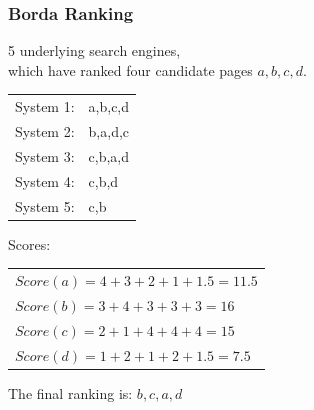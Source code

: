 \documentclass{beamer}
\begin{document}
\begin{frame}
    \frametitle{Borda Ranking}


    \begin{block}{5 underlying search engines, \\ 
          which have ranked  four candidate pages $a,b,c,d$.}
        \begin{tabular}{ll}
          System 1: & a,b,c,d \\
          System 2: & b,a,d,c \\
          System 3: & c,b,a,d \\
          System 4: & c,b,d \\
          System 5: & c,b \\
        \end{tabular}

    \end{block}

    \begin{block} {Scores:} 

        \begin{tabular}{l}
          $Score(a) = 4+3+2+1+1.5=11.5$ \\
          $Score(b) = 3+4+3+3+3 = 16 $ \\
          $Score(c) = 2+1+4+4+4=15$ \\
          $Score(d) = 1+2+1+2+1.5=7.5$ \\
        \end{tabular}

    \end{block}


    The final ranking is: $b,c,a,d$

\end{frame}
\end{document}
